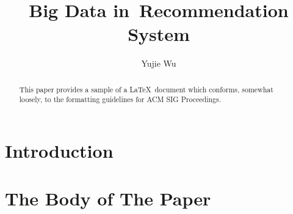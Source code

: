 \documentclass[sigconf]{acmart}
\begin{document}
\title{Big Data in Recommendation System}


\author{Yujie Wu}


\renewcommand{\shortauthors}{Y. Wu}


\begin{abstract}
This paper provides a sample of a \LaTeX\ document which conforms,
somewhat loosely, to the formatting guidelines for
ACM SIG Proceedings.
\end{abstract}



\maketitle

\section{Introduction}



\section{The Body of The Paper}



 
\end{document}

